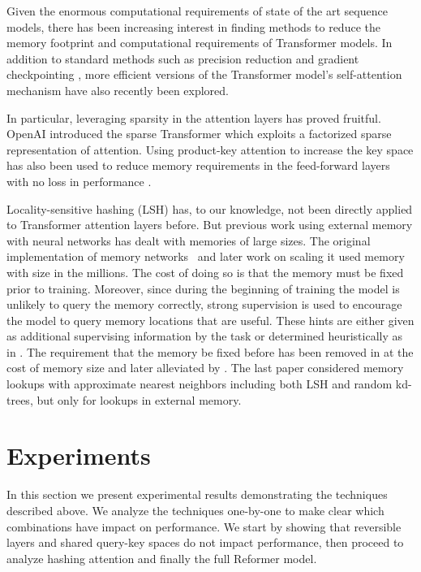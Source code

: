 \documentclass{article} \usepackage{iclr2020_conference,times}
\begin{document}
Given the enormous computational requirements of state of the art sequence models, 
there has been increasing interest in finding methods to reduce the memory footprint and computational 
requirements of Transformer models.  In addition to standard methods such as precision reduction and gradient checkpointing \citep{sohoni2019lowmemory}, more efficient versions of the Transformer model's self-attention mechanism \citep{sukhbaatar2019adaptiveattn, sukhbaatar2019persistentmemory} have also recently been explored.

In particular, leveraging sparsity in the attention layers has proved fruitful. OpenAI introduced
the sparse Transformer \citep{child2019sparsetransformer} which exploits a factorized sparse 
representation of attention.  Using product-key attention to increase the key space has also been used to reduce memory requirements in the feed-forward layers with no loss in performance 
\citep{lample2019productkeys}.

Locality-sensitive hashing (LSH) has, to our knowledge, not been directly applied to 
Transformer attention layers before. But previous work using external memory with neural networks has
dealt with memories of large sizes.  The original implementation of memory networks~\citep{mem_nets} and later work on scaling it \citep{large_mem_nets, hier_mem_nets} used memory with size in the millions.  The cost of doing so is that the memory must be fixed prior to training. Moreover, since during the beginning of training the model is unlikely to query the memory correctly, strong supervision is used to encourage the model to query memory locations that are useful. These hints are either given as additional supervising information by the  task or determined heuristically as in \citet{goldilocks}.
The requirement that the memory be fixed before has been removed in
\citet{santoro16} at the cost of memory size and later alleviated by \citet{jack_rae}. The last paper considered memory lookups with approximate nearest neighbors including both LSH and random kd-trees, but only for lookups in external memory.



\section{Experiments} \label{sec:exp}

In this section we present experimental results demonstrating the techniques
described above. We analyze the techniques one-by-one to make clear which
combinations have impact on performance. We start by showing that reversible
layers and shared query-key spaces do not impact performance, then proceed 
to analyze hashing attention and finally the full Reformer model.
\end{document}
